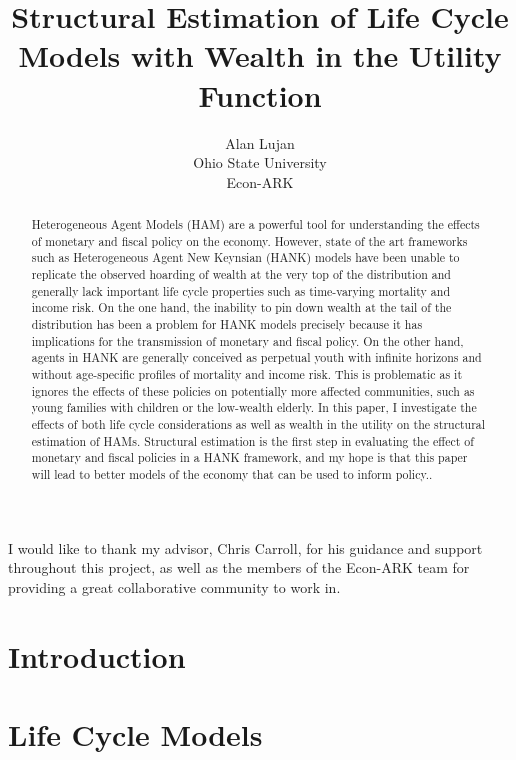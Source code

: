 \documentclass{article}
\title{Structural Estimation of Life Cycle Models with Wealth in the Utility Function}
\date{\displaydate{articleDate}}
\author{Alan Lujan\footnotemark[1]\\
Ohio State University\\Econ-ARK\\}
\begin{document}
\maketitle
{}

\begin{abstract}
Heterogeneous Agent Models (HAM) are a powerful tool for understanding the effects of monetary and fiscal policy on the economy. However, state of the art frameworks such as Heterogeneous Agent New Keynsian (HANK) models have been unable to replicate the observed hoarding of wealth at the very top of the distribution and generally lack important life cycle properties such as time-varying mortality and income risk. On the one hand, the inability to pin down wealth at the tail of the distribution has been a problem for HANK models precisely because it has implications for the transmission of monetary and fiscal policy. On the other hand, agents in HANK are generally conceived as perpetual youth with infinite horizons and without age-specific profiles of mortality and income risk. This is problematic as it ignores the effects of these policies on potentially more affected communities, such as young families with children or the low-wealth elderly. In this paper, I investigate the effects of both life cycle considerations as well as wealth in the utility on the structural estimation of HAMs. Structural estimation is the first step in evaluating the effect of monetary and fiscal policies in a HANK framework, and my hope is that this paper will lead to better models of the economy that can be used to inform policy..
\end{abstract}


I would like to thank my advisor, Chris Carroll, for his guidance and support throughout this project, as well as the members of the Econ-ARK team for providing a great collaborative community to work in.

\section{Introduction}\label{Introduction}

\section{Life Cycle Models}\label{Life Cycle Models}
\end{document}
